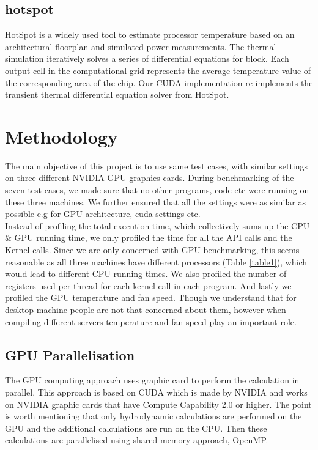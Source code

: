 \documentclass[paper=a4, fontsize=11pt]{scrartcl}
\numberwithin{equation}{section}		%
\numberwithin{figure}{section}			%
\numberwithin{table}{section}				%
\begin{document}
\subsection{hotspot}
HotSpot is a widely used tool to estimate processor temperature based on an architectural floorplan and simulated power measurements. The thermal simulation iteratively solves a series of differential equations for block. Each output cell in the computational grid represents the average temperature value of the corresponding area of the chip. Our CUDA implementation re-implements the transient thermal differential equation solver from HotSpot.






\newpage
\section{Methodology}
The main objective of this project is to use same test cases, with similar settings on three different NVIDIA GPU graphics cards. During benchmarking of the seven test cases, we made sure that no other programs, code etc were running on these three machines. We further ensured that all the settings were as similar as possible e.g for GPU architecture, cuda settings etc.\\


Instead of profiling the total execution time, which collectively sums up the CPU \& GPU running time, we only profiled the time for all the API calls and the Kernel calls. Since we are only concerned with GPU benchmarking, this seems reasonable as all three machines have different processors (Table \ref{table1}), which would lead to different CPU running times. We also profiled the number of registers used per thread for each kernel call in each program. And lastly we profiled the GPU temperature and fan speed. Though we understand that for desktop machine people are not that concerned about them, however when compiling different servers temperature and fan speed play an important role.  

\subsection{GPU Parallelisation}
The GPU computing approach uses graphic card to perform the calculation in parallel. This approach is based on CUDA which is made by NVIDIA and works on NVIDIA graphic cards that have Compute Capability 2.0 or higher. The point is worth mentioning that only hydrodynamic calculations are performed on the GPU and the additional calculations are run on the CPU. Then these calculations are parallelised using shared memory approach, OpenMP.
\end{document}
